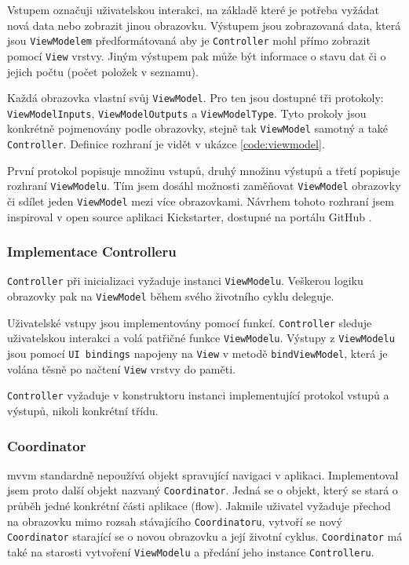 Vstupem označuji uživatelskou interakci, na základě které je potřeba vyžádat nová data nebo zobrazit jinou obrazovku.
Výstupem jsou zobrazovaná data, která jsou \texttt{ViewModelem} předformátovaná aby je \texttt{Controller} mohl přímo zobrazit pomocí \texttt{View} vrstvy.
Jiným výstupem pak může být informace o stavu dat či o jejich počtu (počet položek v seznamu).

Každá obrazovka vlastní svůj \texttt{ViewModel}.
Pro ten jsou dostupné tři protokoly: \texttt{ViewModelInputs}, \texttt{ViewModelOutputs} a \texttt{ViewModelType}.
Tyto prokoly jsou konkrétně pojmenovány podle obrazovky, stejně tak \texttt{ViewModel} samotný a také \texttt{Controller}.
Definice rozhraní je vidět v ukázce \ref{code:viewmodel}.


První protokol popisuje množinu vstupů, druhý množinu výstupů a třetí popisuje rozhraní \texttt{ViewModelu}.
Tím jsem dosáhl možnosti zaměňovat \texttt{ViewModel} obrazovky či sdílet jeden \texttt{ViewModel} mezi více obrazovkami.
Návrhem tohoto rozhraní jsem inspiroval v open source aplikaci Kickstarter, dostupné na portálu GitHub \cite{github-kickstarter}.

\subsubsection*{Implementace Controlleru}

\texttt{Controller} při inicializaci vyžaduje instanci \texttt{ViewModelu}.
Veškerou logiku obrazovky pak na \texttt{ViewModel} během svého životního cyklu deleguje.

Uživatelské vstupy jsou implementovány pomocí funkcí.
\texttt{Controller} sleduje uživatelskou interakci a volá patřičné funkce \texttt{ViewModelu}.
Výstupy z \texttt{ViewModelu} jsou pomocí \texttt{UI bindings} napojeny na \texttt{View} v metodě \texttt{bindViewModel}, která je volána těsně po načtení \texttt{View} vrstvy do paměti.

\texttt{Controller} vyžaduje v konstruktoru instanci implementující protokol vstupů a výstupů, nikoli konkrétní třídu.

\subsubsection*{Coordinator}

\acrshort{mvvm} standardně nepoužívá objekt spravující navigaci v aplikaci.
Implementoval jsem proto další objekt nazvaný \texttt{Coordinator}.
Jedná se o objekt, který se stará o průběh jedné konkrétní části aplikace (flow).
Jakmile uživatel vyžaduje přechod na obrazovku mimo rozsah stávajícího \texttt{Coordinatoru}, vytvoří se nový \texttt{Coordinator} starající se o novou obrazovku a její životní cyklus.
\texttt{Coordinator} má také na starosti vytvoření \texttt{ViewModelu} a předání jeho instance \texttt{Controlleru}.

